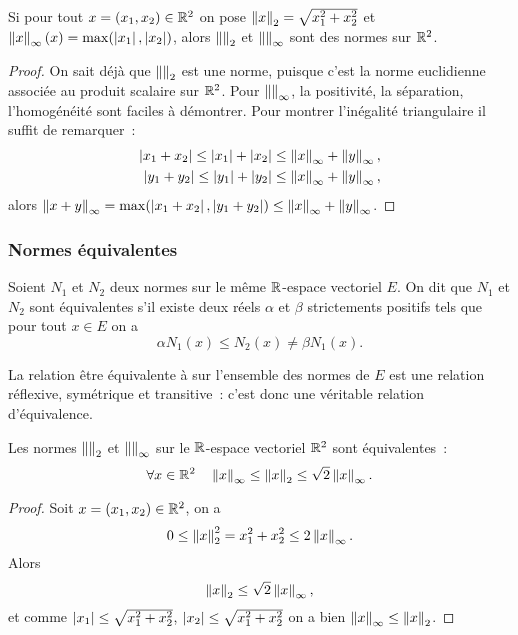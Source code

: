 \begin{prop}
  Si pour tout $x =(x_1, x_2) \in \mathbb{R}^2$ on pose $\left\lVert x\right\rVert_2 = \sqrt{x_1^2+ x_2^2}$ et $\left\lVert x\right\rVert_{\infty}(x)=\max(\left\lvert x_1\right\rvert, \left\lvert x_2\right\rvert)$, alors $\left\lVert\right\rVert_2$ et $\left\lVert\right\rVert_\infty$ sont des normes sur $\mathbb{R}^2$.
\end{prop}
\begin{proof}
  On sait déjà que $\left\lVert\right\rVert_2$ est une norme, puisque c'est la norme euclidienne associée au produit scalaire sur $\mathbb{R}^2$. Pour $\left\lVert\right\rVert_\infty$, la positivité, la séparation, l'homogénéité sont faciles à démontrer. Pour montrer l'inégalité triangulaire il suffit de remarquer~:
  \begin{align}
    \left\lvert x_1+x_2\right\rvert \leq \left\lvert x_1\right\rvert+\left\lvert x_2\right\rvert \leq \left\lVert x\right\rVert_\infty + \left\lVert y\right\rVert_\infty, \\
    \left\lvert y_1+y_2\right\rvert \leq \left\lvert y_1\right\rvert+\left\lvert y_2\right\rvert \leq \left\lVert x\right\rVert_\infty + \left\lVert y\right\rVert_\infty,
  \end{align}
  alors $\left\lVert x+y\right\rVert_\infty = \max(\left\lvert x_1+x_2\right\rvert, \left\lvert y_1+y_2\right\rvert) \leq \left\lVert x\right\rVert_\infty + \left\lVert y\right\rVert_\infty$.
\end{proof}

\subsubsection{Normes équivalentes}

\begin{defdef}
  Soient $N_1$ et $N_2$ deux normes sur le même $\mathbb{R}$-espace vectoriel $E$. On dit que $N_1$ et $N_2$ sont équivalentes s'il existe deux réels $\alpha$ et $\beta$ strictements positifs tels que pour tout $x \in E$ on a
  \begin{equation}
    \alpha N_1(x) \leq N_2(x) \neq \beta N_1(x).
  \end{equation}  
\end{defdef}
La relation \og{} être équivalente à\fg{} sur l'ensemble des normes de $E$ est une relation réflexive, symétrique et transitive~: c'est donc une véritable relation d'équivalence.
%
\begin{prop}
  Les normes $\left\lVert\right\rVert_2$ et $\left\lVert\right\rVert_\infty$ sur le $\mathbb{R}$-espace vectoriel $\mathbb{R}^2$ sont équivalentes~:
  \begin{equation}
    \forall x \in \mathbb{R}^2 \quad \left\lVert x\right\rVert_\infty \leq \left\lVert x\right\rVert_2 \leq \sqrt{2}\left\lVert x\right\rVert_\infty.
  \end{equation}
\end{prop}
\begin{proof}
  Soit $x=(x_1, x_2) \in \mathbb{R}^2$, on a
  \begin{equation}
    0 \leq \left\lVert x\right\rVert_2^2 = x_1^2+x_2^2 \leq 2\left\lVert x\right\rVert_\infty.
  \end{equation}
  Alors
  \begin{equation}
    \left\lVert x\right\rVert_2 \leq \sqrt{2} \left\lVert x\right\rVert_\infty,
  \end{equation}
  et comme $\left\lvert x_1\right\rvert \leq \sqrt{x_1^2 + x_2^2}$, $\left\lvert x_2\right\rvert \leq \sqrt{x_1^2 + x_2^2}$ on a bien $\left\lVert x\right\rVert_\infty \leq \left\lVert x\right\rVert_2$.
\end{proof}

